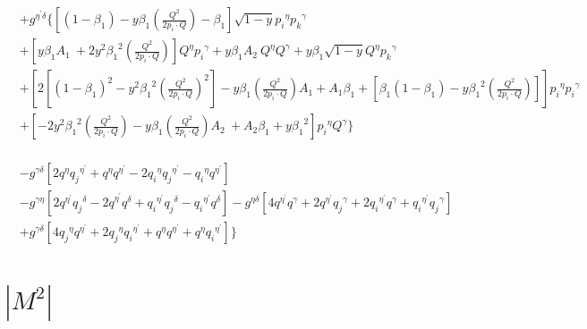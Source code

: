 \begin{equation}
\begin{split} 
&+g^{{{\eta}^{\prime}}{{\delta}}}\lbrace [(1-\beta_1)-y\beta_1 (\frac{Q^2}{2p_i \cdot Q})-\beta_1] \sqrt{1-y}{p_i}^{{\eta}}{{p_k}^{{\gamma}}}\\
&+[y {\beta_1} A_1 \:+2y^2 {\beta_1}^2 (\frac{Q^2}{2p_i \cdot Q})]{Q}^{{\eta}}{p_i}^{{\gamma}}+y {\beta_1} A_2 \:{Q}^{{\eta}}{Q}^{{\gamma}}+y {\beta_1}\sqrt{1-y}{Q}^{{\eta}}{{p_k}^{{\gamma}}}\\
&+[2[(1-\beta_1)^2-y^2 {\beta_1}^2 (\frac{Q^2}{2p_i \cdot Q})^2]-y {\beta_1} (\frac{Q^2}{2p_i \cdot Q}) A_1 +A_1\beta_1 +[\beta_1(1-\beta_1)-y {\beta_1}^2 (\frac{Q^2}{2p_i \cdot Q})]] {p_i}^{{\eta}}{p_i}^{{\gamma}}\\
& +[-2y^2 {\beta_1}^2 (\frac{Q^2}{2p_i \cdot Q})-y {\beta_1} (\frac{Q^2}{2p_i \cdot Q}) A_2\:+A_2\beta_1 +y {\beta_1}^2] {p_i}^{{\eta}}{Q}^{{\gamma}}\rbrace\\
\end{split}
\end{equation}



\begin{equation}
\begin{split} 
&-g^{{{\gamma}}{{\delta}}}[2{q}^{\eta}{q_j}^{{\eta}^{\prime}}+{q}^{\eta}{q}^{{\eta}^{\prime}}-2{q_i}^{\eta}{q_j}^{{\eta}^{\prime}}-{q_i}^{\eta}{q}^{{\eta}^{\prime}}]\\
&-g^{{{\gamma}}{{\eta}}}[2{q}^{{\eta}^{\prime}}{q_j}^{{\delta}}-{2q}^{{\eta}^{\prime}}{q}^{{\delta}}+{q_i}^{{\eta}^{\prime}}{q_j}^{{\delta}}-{q_i}^{{\eta}^{\prime}}{q}^{{\delta}}]-g^{{{\eta}}{{\delta}}}[4{q}^{{\eta}^{\prime}}{q}^{{\gamma}}+2{q}^{{\eta}^{\prime}}{q_j}^{{\gamma}}+2{q_i}^{{\eta}^{\prime}}{q}^{{\gamma}}+{q_i}^{{\eta}^{\prime}}{q_j}^{{\gamma}}]\\
&+g^{{{\gamma}}{{\delta}}}[4{q_j}^{{\eta}}{q}^{{\eta}^{\prime}}+2{q_j}^{{\eta}}{q_i}^{{\eta}^{\prime}}+{q}^{{\eta}}{q}^{{\eta}^{\prime}}+{q}^{{\eta}}{q_i}^{{\eta}^{\prime}}]\rbrace
\end{split}
\end{equation}
\pagebreak

\section{$|M^{2}|$}
%





























